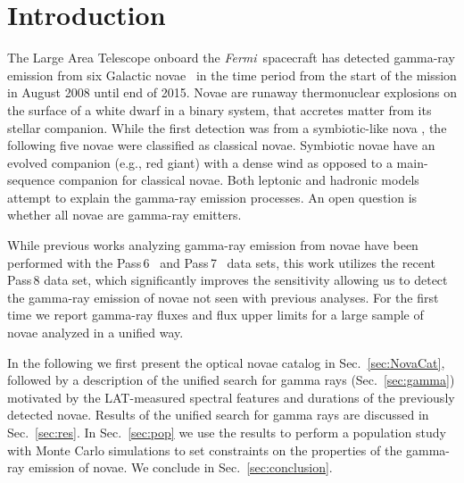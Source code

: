 \documentclass{aa} %
\newcommand{\Fermi}{\textit{Fermi}}
\begin{document}
\maketitle


\section{Introduction}
\label{sec:intro}



The Large Area Telescope \citep[LAT;][]{2009ApJ...697.1071A} onboard the \Fermi\ spacecraft has detected gamma-ray emission from six Galactic novae~\citep{2014Sci...345..554A,2016ApJ...826..142C} in the time period from the start of the mission in August 2008 until end of 2015. Novae are runaway thermonuclear explosions on the surface of a white dwarf in a binary system, that accretes matter from its stellar companion. While the first detection was from a symbiotic-like nova \citep{2010Sci...329..817A}, the following five novae were classified as classical novae. Symbiotic novae have an evolved companion (e.g., red giant) with a dense wind as opposed to a main-sequence companion for classical novae. Both leptonic and hadronic models attempt to explain the gamma-ray emission processes. An open question is whether all novae are gamma-ray emitters.

While previous works analyzing gamma-ray emission from novae have been performed with the Pass\,6~\citep{2010Sci...329..817A} and Pass\,7~\citep{2014Sci...345..554A,2016ApJ...826..142C} data sets, this work utilizes the recent Pass\,8 data set, which significantly improves the sensitivity allowing us to detect the gamma-ray emission of novae not seen with previous analyses. For the first time we report gamma-ray fluxes and flux upper limits for a large sample of novae analyzed in a unified way.

In the following we first present the optical novae catalog in Sec.~\ref{sec:NovaCat}, followed by a description of the unified search for gamma rays (Sec.~\ref{sec:gamma}) motivated by the LAT-measured spectral features and durations of the previously detected novae. Results of the unified search for gamma rays are discussed in Sec.~\ref{sec:res}. In Sec.~\ref{sec:pop} we use the results to perform a population study with Monte Carlo simulations to set constraints on the properties of the gamma-ray emission of novae. We conclude in Sec.~\ref{sec:conclusion}.
\end{document}
